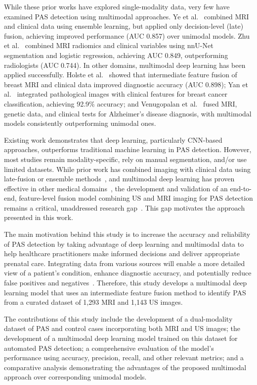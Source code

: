 \documentclass[12pt]{article}
\begin{document}
While these prior works have explored single-modality data, very few have examined PAS detection using multimodal approaches. Ye et al.~\cite{Ye_2022} combined MRI and clinical data using ensemble learning, but applied only decision-level (late) fusion, achieving improved performance (AUC 0.857) over unimodal models. Zhu et al.~\cite{Zhu_2022} combined MRI radiomics and clinical variables using nnU-Net segmentation and logistic regression, achieving AUC 0.849, outperforming radiologists (AUC 0.744). In other domains, multimodal deep learning has been applied successfully. Holste et al.~\cite{Holste_2021} showed that intermediate feature fusion of breast MRI and clinical data improved diagnostic accuracy (AUC 0.898); Yan et al.~\cite{Yan_2021} integrated pathological images with clinical features for breast cancer classification, achieving 92.9\% accuracy; and Venugopalan et al.~\cite{Venugopalan_2021} fused MRI, genetic data, and clinical tests for Alzheimer's disease diagnosis, with multimodal models consistently outperforming unimodal ones. 

Existing work demonstrates that deep learning, particularly CNN-based approaches, outperforms traditional machine learning in PAS detection. However, most studies remain modality-specific, rely on manual segmentation, and/or use limited datasets. While prior work has combined imaging with clinical data using late-fusion or ensemble methods~\cite{Ye_2022, Zhu_2022}, and multimodal deep learning has proven effective in other medical domains~\cite{Pei_2023}, the development and validation of an end-to-end, feature-level fusion model combining US and MRI imaging for PAS detection remains a critical, unaddressed research gap~\cite{Danaei_2025, Jittou_2025}. This gap motivates the approach presented in this work.

The main motivation behind this study is to increase the accuracy and reliability of PAS detection by taking advantage of deep learning and multimodal data to help healthcare practitioners make informed decisions and deliver appropriate prenatal care. Integrating data from various sources will enable a more detailed view of a patient's condition, enhance diagnostic accuracy, and potentially reduce false positives and negatives~\cite{Wang_2023}. Therefore, this study develops a multimodal deep learning model that uses an intermediate feature fusion method to identify PAS from a curated dataset of 1,293 MRI and 1,143 US images.

The contributions of this study include the development of a dual-modality dataset of PAS and control cases incorporating both MRI and US images; the development of a multimodal deep learning model trained on this dataset for automated PAS detection; a comprehensive evaluation of the model's performance using accuracy, precision, recall, and other relevant metrics; and a comparative analysis demonstrating the advantages of the proposed multimodal approach over corresponding unimodal models.
\end{document}
